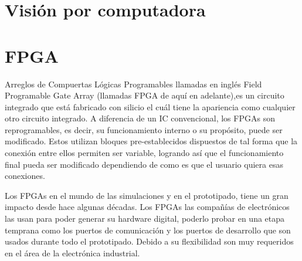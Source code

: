 \documentclass[twoside,spanish,ESP,MSc]{plantillaLabUPV}
\theoremstyle{definition}
\newcommand{\fs}{FPGAs }
\begin{document}
%

\section{Visión por computadora}




\section{FPGA}
Arreglos de Compuertas Lógicas Programables llamadas en inglés Field Programable Gate Array (llamadas FPGA de aquí en adelante),es un circuito integrado que está fabricado con silicio el cuál %
tiene la apariencia como cualquier otro circuito integrado. A diferencia de un IC convencional, los \fs son reprogramables, es decir, su funcionamiento interno o su propósito, puede ser modificado. Estos utilizan bloques pre-establecidos dispuestos de tal forma que la conexión entre ellos permiten ser variable, logrando así que el funcionamiento final pueda ser modificado dependiendo de como es que el usuario quiera esas conexiones.

Los FPGAs en el mundo de las simulaciones y en el prototipado, tiene un gran impacto desde hace algunas décadas. Los FPGAs las compañías de electrónicos las usan para poder generar su hardware digital, poderlo probar en una etapa temprana como los puertos de comunicación y los puertos de desarrollo que son usados durante todo el prototipado. Debido a su flexibilidad son muy requeridos en el área de la electrónica industrial. 
\end{document}
